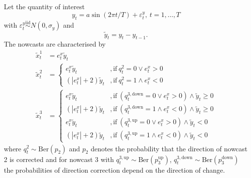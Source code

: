 \documentclass[oneside]{article}
\theoremstyle{plain}%
\theoremstyle{definition}
\newcommand{\ydiff}{\tilde{y}}
\newcommand{\xdiff}{\tilde{x}}
\begin{document}
Let the quantity of interest 
\begin{equation}
  y_t = a \sin(2 \pi t / T) + \varepsilon_t^y, \ t = 1, \dots, T
\end{equation}
with $\varepsilon_t^y \stackrel{\text{iid}}{\sim} N(0, \sigma_y)$ and 
\begin{equation}
  \ydiff_t = y_t - y_{t-1}.
\end{equation}
The nowcasts are characterised by 
\begin{align}
	\xdiff_t^1 &= e^x_t \ydiff_t \\
	\xdiff_t^2 &= \begin{cases}
		e^x_t \ydiff_t &, \text{if}\ q^2_t = 0 \lor e^x_t > 0\\
		(| e^x_t | + 2) \ydiff_t &, \text{if}\ q^2_t = 1 \land e^x_t < 0
	\end{cases} \\
	\xdiff_t^3 &= \begin{cases}
		e^x_t \ydiff_t &, \text{if}\ (q^{3, \text{down}}_t = 0 \lor e^x_t > 0) \land \ydiff_t \geq 0\\
		(| e^x_t | + 2) \ydiff_t &, \text{if}\ (q^{3, \text{down}}_t = 1 \land e^x_t < 0) \land \ydiff_t \geq 0 \\
		e^x_t \ydiff_t &, \text{if}\ (q^{3, \text{up}}_t = 0 \lor e^x_t > 0) \land \ydiff_t < 0\\
		(| e^x_t | + 2) \ydiff_t &, \text{if}\ (q^{3, \text{up}}_t = 1 \land e^x_t < 0) \land \ydiff_t < 0
	\end{cases}
\end{align}
where $q^2_t \sim \text{Ber}(p_2)$ and $p_2$ denotes the probability that the direction of nowcast 2 is corrected and for nowcast 3 with $q^{3, \text{up}}_t \sim \text{Ber}(p_3^{\text{up}})$, $q^{3, \text{down}}_t \sim \text{Ber}(p_3^{\text{down}})$ the probabilities of direction correction depend on the direction of change.
\end{document}
